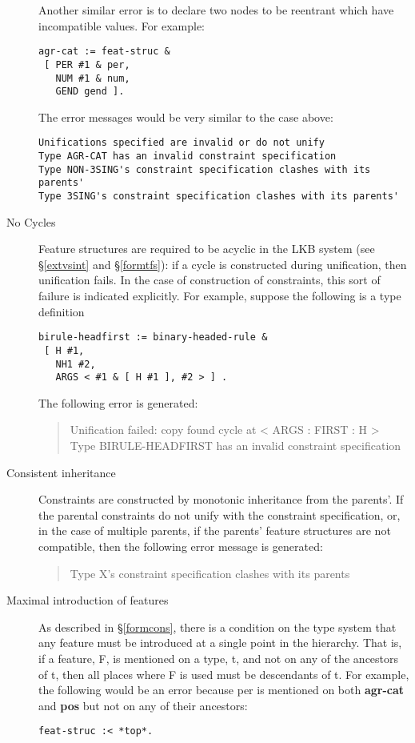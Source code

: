 \documentclass[12pt]{report}
\newenvironment{error}%
{\begin{quote}
\tt
}%
{\end{quote}
}
\begin{document}
\begin{description}
Another similar error is to declare two nodes to be reentrant which
have incompatible values.  For example:
\begin{verbatim}
agr-cat := feat-struc &
 [ PER #1 & per,
   NUM #1 & num,
   GEND gend ].
\end{verbatim}
The error messages would be very similar to the case above:
\begin{verbatim}
Unifications specified are invalid or do not unify
Type AGR-CAT has an invalid constraint specification
Type NON-3SING's constraint specification clashes with its parents'
Type 3SING's constraint specification clashes with its parents'
\end{verbatim}
\item[No Cycles] 
Feature structures are required to be acyclic
in the LKB system (see \S\ref{extvsint} and
\S\ref{formtfs}): if a cycle is constructed
during unification, then unification fails.  In the case
of construction of constraints, this sort of 
failure is indicated explicitly.
For example, suppose the following is a type definition
\begin{verbatim}
birule-headfirst := binary-headed-rule &
 [ H #1,
   NH1 #2,
   ARGS < #1 & [ H #1 ], #2 > ] .
\end{verbatim}
The following error is generated:
\begin{error}
Unification failed: copy found cycle at < ARGS : FIRST : H >\\
Type BIRULE-HEADFIRST has an invalid constraint specification
\end{error}
\item[Consistent inheritance]
Constraints are constructed by monotonic inheritance from 
the parents'.  If the parental constraints do not unify with
the constraint specification, or, in the case of multiple parents,
if the parents' feature structures are not compatible,
then the following error message is generated:
\begin{error}
Type X's constraint specification clashes with its parents
\end{error}
\item[Maximal introduction of features]
As described in \S\ref{formcons},
there is a condition on the type system that any feature
must be introduced at a single point in the hierarchy.
That is, if a feature, F, is mentioned on a type, t, and 
not on any of the ancestors of t, then all places where
F is used must be descendants of t.
For example, the following would be an error because {\sc per}
is mentioned on both {\bf agr-cat} and {\bf pos} but not on
any of their ancestors:
\begin{verbatim}
feat-struc :< *top*.


\end{verbatim}
\end{description}
\end{document}
